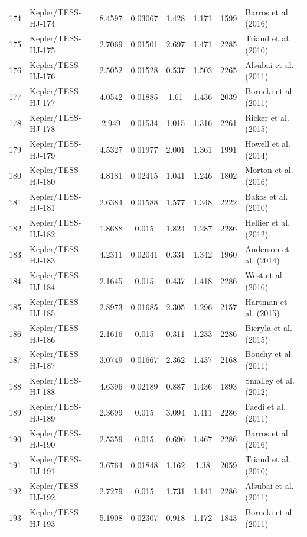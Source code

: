 \begin{longtable}{r l c c c c c p{4.2cm}}
174 & Kepler/TESS-HJ-174 & 8.4597 & 0.03067 & 1.428 & 1.171 & 1599 & Barros et al. (2016) \\
175 & Kepler/TESS-HJ-175 & 2.7069 & 0.01501 & 2.697 & 1.471 & 2285 & Triaud et al. (2010) \\
176 & Kepler/TESS-HJ-176 & 2.5052 & 0.01528 & 0.537 & 1.503 & 2265 & Alsubai et al. (2011) \\
177 & Kepler/TESS-HJ-177 & 4.0542 & 0.01885 & 1.61 & 1.436 & 2039 & Borucki et al. (2011) \\
178 & Kepler/TESS-HJ-178 & 2.949 & 0.01534 & 1.015 & 1.316 & 2261 & Ricker et al. (2015) \\
179 & Kepler/TESS-HJ-179 & 4.5327 & 0.01977 & 2.001 & 1.361 & 1991 & Howell et al. (2014) \\
180 & Kepler/TESS-HJ-180 & 4.8181 & 0.02415 & 1.041 & 1.246 & 1802 & Morton et al. (2016) \\
181 & Kepler/TESS-HJ-181 & 2.6384 & 0.01588 & 1.577 & 1.348 & 2222 & Bakos et al. (2010) \\
182 & Kepler/TESS-HJ-182 & 1.8688 & 0.015 & 1.824 & 1.287 & 2286 & Hellier et al. (2012) \\
183 & Kepler/TESS-HJ-183 & 4.2311 & 0.02041 & 0.331 & 1.342 & 1960 & Anderson et al. (2014) \\
184 & Kepler/TESS-HJ-184 & 2.1645 & 0.015 & 0.437 & 1.418 & 2286 & West et al. (2016) \\
185 & Kepler/TESS-HJ-185 & 2.8973 & 0.01685 & 2.305 & 1.296 & 2157 & Hartman et al. (2015) \\
186 & Kepler/TESS-HJ-186 & 2.1616 & 0.015 & 0.311 & 1.233 & 2286 & Bieryla et al. (2015) \\
187 & Kepler/TESS-HJ-187 & 3.0749 & 0.01667 & 2.362 & 1.437 & 2168 & Bouchy et al. (2011) \\
188 & Kepler/TESS-HJ-188 & 4.6396 & 0.02189 & 0.887 & 1.436 & 1893 & Smalley et al. (2012) \\
189 & Kepler/TESS-HJ-189 & 2.3699 & 0.015 & 3.094 & 1.411 & 2286 & Faedi et al. (2011) \\
190 & Kepler/TESS-HJ-190 & 2.5359 & 0.015 & 0.696 & 1.467 & 2286 & Barros et al. (2016) \\
191 & Kepler/TESS-HJ-191 & 3.6764 & 0.01848 & 1.162 & 1.38 & 2059 & Triaud et al. (2010) \\
192 & Kepler/TESS-HJ-192 & 2.7279 & 0.015 & 1.731 & 1.141 & 2286 & Alsubai et al. (2011) \\
193 & Kepler/TESS-HJ-193 & 5.1908 & 0.02307 & 0.918 & 1.172 & 1843 & Borucki et al. (2011) \\

\end{longtable}
